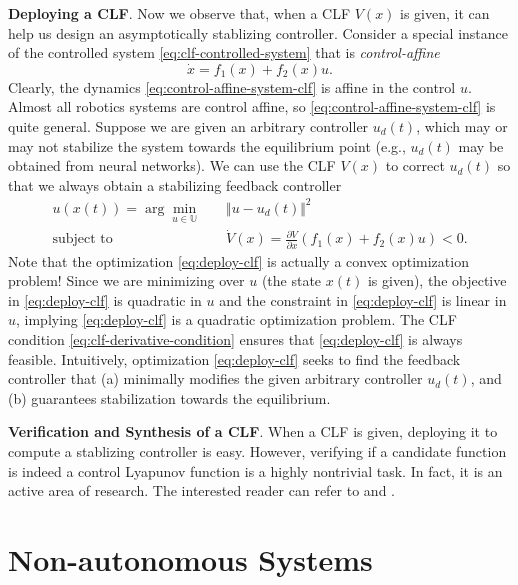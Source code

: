 \documentclass[
]{book}
\theoremstyle{definition}
\theoremstyle{definition}
\theoremstyle{definition}
\theoremstyle{definition}
\theoremstyle{remark}
\begin{document}
\textbf{Deploying a CLF}. Now we observe that, when a CLF \(V(x)\) is given, it can help us design an asymptotically stablizing controller. Consider a special instance of the controlled system \eqref{eq:clf-controlled-system} that is \emph{control-affine}
\begin{equation}
\dot{x} = f_1(x) + f_2(x)u.
\label{eq:control-affine-system-clf}
\end{equation}
Clearly, the dynamics \eqref{eq:control-affine-system-clf} is affine in the control \(u\). Almost all robotics systems are control affine, so \eqref{eq:control-affine-system-clf} is quite general. Suppose we are given an arbitrary controller \(u_d(t)\), which may or may not stabilize the system towards the equilibrium point (e.g., \(u_d(t)\) may be obtained from neural networks). We can use the CLF \(V(x)\) to correct \(u_d(t)\) so that we always obtain a stabilizing feedback controller
\begin{equation}
\begin{split}
u(x(t)) = \arg\min_{u \in \mathbb{U}} & \quad \Vert u - u_d(t) \Vert^2 \\
\text{subject to} & \quad \dot{V}(x) = \frac{\partial V}{\partial x} (f_1(x) + f_2(x) u) < 0.
\end{split}
\label{eq:deploy-clf}
\end{equation}
Note that the optimization \eqref{eq:deploy-clf} is actually a convex optimization problem! Since we are minimizing over \(u\) (the state \(x(t)\) is given), the objective in \eqref{eq:deploy-clf} is quadratic in \(u\) and the constraint in \eqref{eq:deploy-clf} is linear in \(u\), implying \eqref{eq:deploy-clf} is a quadratic optimization problem. The CLF condition \eqref{eq:clf-derivative-condition} ensures that \eqref{eq:deploy-clf} is always feasible. Intuitively, optimization \eqref{eq:deploy-clf} seeks to find the feedback controller that (a) minimally modifies the given arbitrary controller \(u_d(t)\), and (b) guarantees stabilization towards the equilibrium.

\textbf{Verification and Synthesis of a CLF}. When a CLF is given, deploying it to compute a stablizing controller is easy. However, verifying if a candidate function is indeed a control Lyapunov function is a highly nontrivial task. In fact, it is an active area of research. The interested reader can refer to \citep{kang23cdc-verification} and \citep{dai23acc-convex}.

\hypertarget{non-autonomous-systems}{%
\section{Non-autonomous Systems}\label{non-autonomous-systems}}
\end{document}
